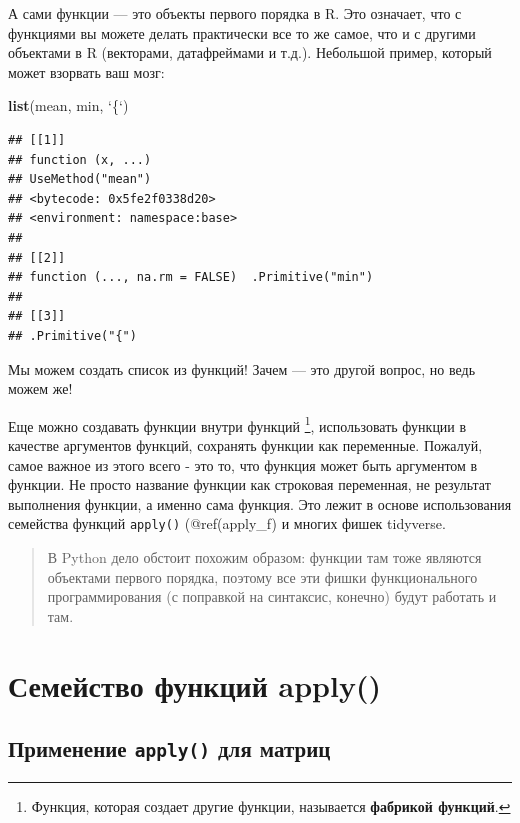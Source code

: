 \documentclass[
]{book}
\newenvironment{Shaded}{\begin{snugshade}}{\end{snugshade}}
\newcommand{\DataTypeTok}[1]{\textcolor[rgb]{0.13,0.29,0.53}{#1}}
\newcommand{\KeywordTok}[1]{\textcolor[rgb]{0.13,0.29,0.53}{\textbf{#1}}}
\newcommand{\NormalTok}[1]{#1}
\newcommand{\StringTok}[1]{\textcolor[rgb]{0.31,0.60,0.02}{#1}}
\begin{document}
А сами функции --- это объекты первого порядка в R. Это означает, что с функциями вы можете делать практически все то же самое, что и с другими объектами в R (векторами, датафреймами и т.д.). Небольшой пример, который может взорвать ваш мозг:

\begin{Shaded}
\begin{Highlighting}[]
\KeywordTok{list}\NormalTok{(mean, min, }\StringTok{`}\DataTypeTok{\{}\StringTok{`}\NormalTok{)}
\end{Highlighting}
\end{Shaded}

\begin{verbatim}
## [[1]]
## function (x, ...) 
## UseMethod("mean")
## <bytecode: 0x5fe2f0338d20>
## <environment: namespace:base>
## 
## [[2]]
## function (..., na.rm = FALSE)  .Primitive("min")
## 
## [[3]]
## .Primitive("{")
\end{verbatim}

Мы можем создать список из функций! Зачем --- это другой вопрос, но ведь можем же!

Еще можно создавать функции внутри функций \footnote{Функция, которая создает другие функции, называется \textbf{фабрикой функций}.}, использовать функции в качестве аргументов функций, сохранять функции как переменные. Пожалуй, самое важное из этого всего - это то, что функция может быть аргументом в функции. Не просто название функции как строковая переменная, не результат выполнения функции, а именно сама функция. Это лежит в основе использования семейства функций \texttt{apply()} (@ref(apply\_f) и многих фишек tidyverse.

\begin{quote}
В Python дело обстоит похожим образом: функции там тоже являются объектами первого порядка, поэтому все эти фишки функционального программирования (с поправкой на синтаксис, конечно) будут работать и там.
\end{quote}

\hypertarget{apply_f}{%
\section{Семейство функций apply()}\label{apply_f}}

\hypertarget{apply}{%
\subsection{\texorpdfstring{Применение \texttt{apply()} для матриц}{Применение apply() для матриц}}\label{apply}}
\end{document}
